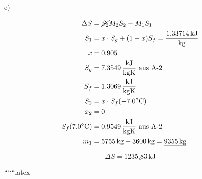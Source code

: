 e)

\begin{align*}
\Delta S &= \cancel{S_2} M_2 S_2 - M_1 S_1 \\
S_1 &= x \cdot S_g + (1-x) S_f = \frac{1.33714 \, \text{kJ}}{\text{kg}} \\
x &= 0.905 \\
S_g &= 7.3549 \, \frac{\text{kJ}}{\text{kgK}} \text{ aus A-2} \\
S_f &= 1.3069 \, \frac{\text{kJ}}{\text{kgK}} \\
S_2 &= x \cdot S_f (-7.0^\circ \text{C}) \\
x_2 &= 0 \\
S_f (7.0^\circ \text{C}) &= 0.9549 \, \frac{\text{kJ}}{\text{kgK}} \text{ aus A-2} \\
m_1 &= 5755 \, \text{kg} + 3600 \, \text{kg} = \underline{9355 \, \text{kg}}
\end{align*}

\[
\Delta S = \underline{1235.83 \, \text{kJ}}
\]

``````latex